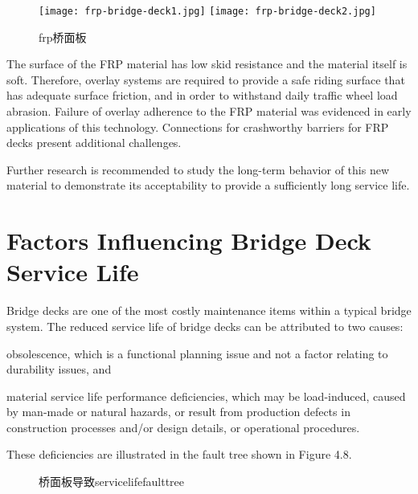 \begin{figure}
  \texttt{[image: frp-bridge-deck1.jpg]}\hfill
  \texttt{[image: frp-bridge-deck2.jpg]}
  \caption{\acrshort*{frp}桥面板}
  \label{fig:frp-bridge-deck}
\end{figure}

The surface of the FRP material has low skid resistance and the material itself is soft. Therefore, overlay systems are required to provide a safe riding surface that has adequate surface friction, and in order to withstand daily traffic wheel load abrasion. Failure of overlay adherence to the FRP material was evidenced in early applications of this technology. Connections for crashworthy barriers for FRP decks present additional challenges.

Further research is recommended to study the long-term behavior of this new material to demonstrate its acceptability to provide a sufficiently long service life.

\section{Factors Influencing Bridge Deck Service Life}
\label{sec:factors-influence}

Bridge decks are one of the most costly maintenance items within a typical bridge system. The reduced service life of bridge decks can be attributed to two causes: 
\begin{enumerate*}
  \item obsolescence, which is a functional planning issue and not a factor relating to durability issues, and 
  \item material service life performance deficiencies, which may be load-induced, caused by man-made or natural hazards, or result from production defects in construction processes and/or design details, or operational procedures. 
\end{enumerate*}
These deficiencies are illustrated in the fault tree shown in Figure 4.8.

\begin{figure}
  \caption{桥面板导致\gls*{servicelife}\gls*{faulttree}}
  \label{fig:fault-tree-bridge-deck}
\end{figure}

